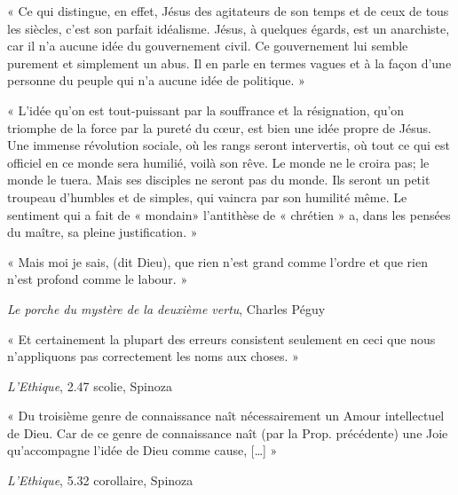 \documentclass{article}
\begin{document}
\begin{center}« Ce qui distingue, en effet, Jésus des agitateurs de son temps et de ceux de tous les siècles, c'est son parfait idéalisme. Jésus, à quelques égards, est un anarchiste, car il n'a aucune idée du gouvernement civil. Ce gouvernement lui semble purement et simplement un abus. Il en parle en termes vagues et à la façon d'une personne du peuple qui n'a aucune idée de politique. »\end{center}

\begin{center}« L'idée qu'on est tout-puissant par la souffrance et la résignation, qu'on triomphe de la force par la pureté du cœur, est bien une idée propre de Jésus. Une immense révolution sociale, où les rangs seront intervertis, où tout ce qui est officiel en ce monde sera humilié, voilà son rêve. Le monde ne le croira pas; le monde le tuera. Mais ses disciples ne seront pas du monde. Ils seront un petit troupeau d'humbles et de simples, qui vaincra par son humilité même.
Le sentiment qui a fait de « mondain» l'antithèse de « chrétien » a, dans les pensées du maître, sa pleine justification. »\end{center}

\begin{center}« Mais moi je sais, (dit Dieu), que rien n’est grand comme l’ordre et que rien n’est profond comme le labour. »\end{center}

\begin{flushright}\textit{Le porche du mystère de la deuxième vertu}, Charles Péguy\end{flushright}

\begin{center}« Et certainement la plupart des erreurs consistent seulement en ceci que nous n'appliquons pas correctement les noms aux choses. »\end{center}

\begin{flushright}\textit{L'Ethique}, 2.47 scolie, Spinoza\end{flushright}


\begin{center}« Du troisième genre de connaissance naît nécessairement un Amour intellectuel de Dieu. Car de ce genre de connaissance naît (par la Prop. précédente) une Joie qu’accompagne l’idée de Dieu comme cause, […] »\end{center}

\begin{flushright}\textit{L'Ethique}, 5.32 corollaire, Spinoza\end{flushright}
\end{document}

